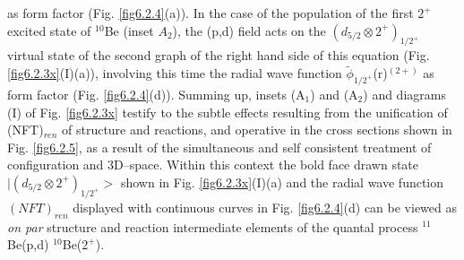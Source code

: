    as form factor (Fig. \ref{fig6.2.4}(a)). 
   In the case of the population of the first $2^+$ excited state of $^{10}$Be (inset $A_2$), the (p,d) field acts on the 
   $(d_{5/2} \otimes 2^+)_{1/2^+}$ virtual state of the second graph of the right hand side   of this equation
   (Fig. \ref{fig6.2.3x}(I)(a)), involving this time the radial wave function 
   $\tilde \phi_{1/2^+}$(r)$^{(2+)}$ as  form factor (Fig. \ref{fig6.2.4}(d)). Summing up, insets 
   (A$_1$) and (A$_2$)  and diagrams (I) of Fig. \ref{fig6.2.3x} testify to the subtle effects resulting  from the unification of (NFT)$_{ren}$ of structure 
   and reactions, and operative in the cross sections shown in Fig. \ref{fig6.2.5}, as a result of the 
   simultaneous and self consistent treatment of configuration and 3D--space.  Within this context
   the bold face drawn state $| (d_{5/2} \otimes 2^+)_{1/2^+}>$ shown in Fig. \ref{fig6.2.3x}(I)(a) 
   and the radial  wave function $(NFT)_{ren}$ displayed with continuous curves in Fig. \ref{fig6.2.4}(d) can be viewed as {\it on par} structure and reaction 
   intermediate elements of the quantal process $^{11}$Be(p,d) $^{10}$Be($2^+$).
   
   

